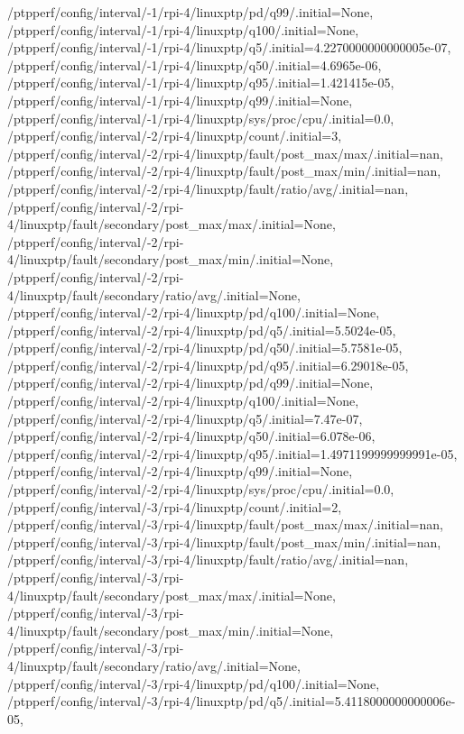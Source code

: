 {    /ptpperf/config/interval/-1/rpi-4/linuxptp/pd/q99/.initial=None,
    /ptpperf/config/interval/-1/rpi-4/linuxptp/q100/.initial=None,
    /ptpperf/config/interval/-1/rpi-4/linuxptp/q5/.initial=4.2270000000000005e-07,
    /ptpperf/config/interval/-1/rpi-4/linuxptp/q50/.initial=4.6965e-06,
    /ptpperf/config/interval/-1/rpi-4/linuxptp/q95/.initial=1.421415e-05,
    /ptpperf/config/interval/-1/rpi-4/linuxptp/q99/.initial=None,
    /ptpperf/config/interval/-1/rpi-4/linuxptp/sys/proc/cpu/.initial=0.0,
    /ptpperf/config/interval/-2/rpi-4/linuxptp/count/.initial=3,
    /ptpperf/config/interval/-2/rpi-4/linuxptp/fault/post_max/max/.initial=nan,
    /ptpperf/config/interval/-2/rpi-4/linuxptp/fault/post_max/min/.initial=nan,
    /ptpperf/config/interval/-2/rpi-4/linuxptp/fault/ratio/avg/.initial=nan,
    /ptpperf/config/interval/-2/rpi-4/linuxptp/fault/secondary/post_max/max/.initial=None,
    /ptpperf/config/interval/-2/rpi-4/linuxptp/fault/secondary/post_max/min/.initial=None,
    /ptpperf/config/interval/-2/rpi-4/linuxptp/fault/secondary/ratio/avg/.initial=None,
    /ptpperf/config/interval/-2/rpi-4/linuxptp/pd/q100/.initial=None,
    /ptpperf/config/interval/-2/rpi-4/linuxptp/pd/q5/.initial=5.5024e-05,
    /ptpperf/config/interval/-2/rpi-4/linuxptp/pd/q50/.initial=5.7581e-05,
    /ptpperf/config/interval/-2/rpi-4/linuxptp/pd/q95/.initial=6.29018e-05,
    /ptpperf/config/interval/-2/rpi-4/linuxptp/pd/q99/.initial=None,
    /ptpperf/config/interval/-2/rpi-4/linuxptp/q100/.initial=None,
    /ptpperf/config/interval/-2/rpi-4/linuxptp/q5/.initial=7.47e-07,
    /ptpperf/config/interval/-2/rpi-4/linuxptp/q50/.initial=6.078e-06,
    /ptpperf/config/interval/-2/rpi-4/linuxptp/q95/.initial=1.4971199999999991e-05,
    /ptpperf/config/interval/-2/rpi-4/linuxptp/q99/.initial=None,
    /ptpperf/config/interval/-2/rpi-4/linuxptp/sys/proc/cpu/.initial=0.0,
    /ptpperf/config/interval/-3/rpi-4/linuxptp/count/.initial=2,
    /ptpperf/config/interval/-3/rpi-4/linuxptp/fault/post_max/max/.initial=nan,
    /ptpperf/config/interval/-3/rpi-4/linuxptp/fault/post_max/min/.initial=nan,
    /ptpperf/config/interval/-3/rpi-4/linuxptp/fault/ratio/avg/.initial=nan,
    /ptpperf/config/interval/-3/rpi-4/linuxptp/fault/secondary/post_max/max/.initial=None,
    /ptpperf/config/interval/-3/rpi-4/linuxptp/fault/secondary/post_max/min/.initial=None,
    /ptpperf/config/interval/-3/rpi-4/linuxptp/fault/secondary/ratio/avg/.initial=None,
    /ptpperf/config/interval/-3/rpi-4/linuxptp/pd/q100/.initial=None,
    /ptpperf/config/interval/-3/rpi-4/linuxptp/pd/q5/.initial=5.4118000000000006e-05,
}
